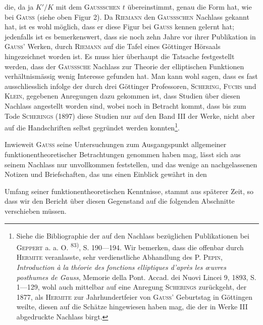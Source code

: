 die, da ja \(K'/K\) mit dem \textsc{Gaussschen} \(t\) übereinstimmt, genau
die Form hat, wie bei \textsc{Gauss} (siehe oben Figur 2). Da \textsc{Riemann} den \textsc{Gaussschen}
Nachlass gekannt hat, ist es wohl möglich, dass er diese Figur bei
\textsc{Gauss} kennen gelernt hat; jedenfalls ist es bemerkenswert, dass sie noch zehn
Jahre vor ihrer Publikation in \textsc{Gauss’} Werken, durch \textsc{Riemann} auf die Tafel
eines Göttinger Hörsaals hingezeichnet worden ist. Es muss hier überhaupt
die Tatsache festgestellt werden, dass der \textsc{Gausssche} Nachlass zur Theorie der
elliptischen Funktionen verhältnismässig wenig Interesse gefunden hat. Man
kann wohl sagen, dass es fast ausschliesslich infolge der durch drei Göttinger
Professoren, \textsc{Schering}, \textsc{Fuchs} und \textsc{Klein}, gegebenen Anregungen dazu gekommen
ist, dass Studien über diesen Nachlass angestellt worden sind, wobei
noch in Betracht kommt, dass bis zum Tode \textsc{Scherings} (1897) diese Studien
nur auf den Band III der Werke, nicht aber auf die Handschriften selbst
gegründet werden konnten\footnote{Siehe die Bibliographie der auf den Nachlass bezüglichen Publikationen bei \textsc{Geppert} a. a. O. \textsuperscript{83)}, S. 190—194. Wir bemerken, dass die offenbar durch \textsc{Hermite} veranlasste, sehr verdienstliche Abhandlung des P. \textsc{Pepin}, \textit{Introduction à la théorie des fonctions elliptiques d’après les œuvres posthumes de Gauss}, Memorie della Pont. Accad. dei Nuovi Lincei 9, 1893, S. 1—129, wohl auch mittelbar auf eine Anregung \textsc{Scherings} zurückgeht, der 1877, als \textsc{Hermite} zur Jahrhundertfeier von \textsc{Gauss’} Geburtstag in Göttingen weilte, diesen auf die Schätze hingewiesen haben mag, die der in Werke III abgedruckte Nachlass birgt.}.

Inwieweit \textsc{Gauss} seine Untersuchungen zum Ausgangspunkt allgemeiner
funktionentheoretischer Betrachtungen genommen haben mag, lässt sich aus
seinem Nachlass nur unvollkommen feststellen, und das wenige an nachgelassenen
Notizen und Briefschaften, das uns einen Einblick gewährt in den\par
{}
\clearpage{}
\noindent Umfang seiner funktionentheoretischen Kenntnisse, stammt aus späterer Zeit,
so dass wir den Bericht über diesen Gegenstand auf die folgenden Abschnitte
verschieben müssen.
